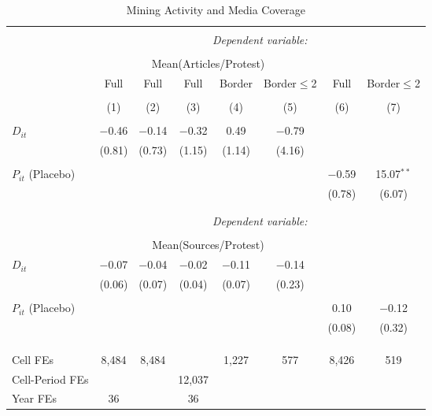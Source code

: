 \begin{table}[ht!] \centering 
  \caption{Mining Activity and Media Coverage} 
  \label{tab:did_gdelt_media} 
\begin{tabular}{@{\extracolsep{0pt}}lccccccc} 
\\[-1.8ex]\hline 
\hline \\[-1.8ex] 
 & \multicolumn{7}{c}{\textit{Dependent variable:}} \\ 
\cline{2-8} 
\\[-1.8ex] & \multicolumn{5}{c}{Mean(Articles/Protest)} & \multicolumn{2}{c}{} \\ 
 & Full & Full & Full & Border & Border$\leq$2 & Full & Border$\leq$2 \\ 
\\[-1.8ex] & (1) & (2) & (3) & (4) & (5) & (6) & (7)\\ 
\hline \\[-1.8ex] 
 $D_{it}$ & $-$0.46 & $-$0.14 & $-$0.32 & 0.49 & $-$0.79 &  &  \\ 
  & (0.81) & (0.73) & (1.15) & (1.14) & (4.16) &  &  \\ 
  & & & & & & & \\ 
 $P_{it}$ (Placebo) &  &  &  &  &  & $-$0.59 & 15.07$^{**}$ \\ 
  &  &  &  &  &  & (0.78) & (6.07) \\ 
  & & & & & & & \\ 
\hline \\[-1.8ex] 
 & \multicolumn{7}{c}{\textit{Dependent variable:}} \\ 
\cline{2-8} 
\\[-1.8ex] & \multicolumn{5}{c}{Mean(Sources/Protest)} & \multicolumn{2}{c}{} \\ 
 $D_{it}$ & $-$0.07 & $-$0.04 & $-$0.02 & $-$0.11 & $-$0.14 &  &  \\ 
  & (0.06) & (0.07) & (0.04) & (0.07) & (0.23) &  &  \\ 
  & & & & & & & \\ 
 $P_{it}$ (Placebo) &  &  &  &  &  & 0.10 & $-$0.12 \\ 
  &  &  &  &  &  & (0.08) & (0.32) \\ 
  & & & & & & & \\ 
\hline \\[-1.8ex] 
\hline \\[-1.8ex] Cell FEs & 8,484 & 8,484 &  & 1,227 & 577 & 8,426 & 519 \\ 
Cell-Period FEs &  &  & 12,037 &  &  &  &  \\ 
Year FEs & 36 &  & 36 &  &  &  &  \\ 

\end{tabular}
\end{table}
